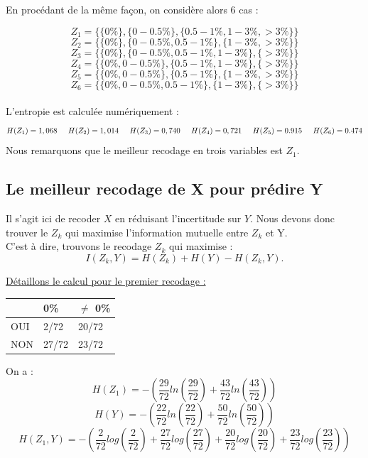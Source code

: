\documentclass{article}
\begin{document}
En procédant de la même façon, on considère alors 6 cas :

\[
Z_1 =\{ \{0 \% \} , \{0 - 0.5 \%\} ,\{0.5-1 \% ,1-3 \% ,>3 \% \} \}  
\]
\[
  Z_2 =\{ \{0 \% \} , \{0 - 0.5\%, 0.5-1 \% \} ,\{1-3 \% ,>3 \% \} \}
\]
\[
  Z_3 =\{ \{0 \% \} , \{0 - 0.5\%, 0.5-1 \% ,1-3 \%  \} ,\{>3 \% \} \}
\]
\[
  Z_4 =\{ \{0 \%, 0 - 0.5\%\} , \{ 0.5-1 \% ,1-3 \%  \} ,\{>3 \% \} \}
\]
\[
  Z_5 =\{ \{0 \%, 0 - 0.5\%\} , \{ 0.5-1 \% \} ,\{1-3 \% , >3 \% \} \}
\]
\[
  Z_6 =\{ \{0 \%, 0 - 0.5\%,  0.5-1 \% \} , \{1-3 \%  \} ,\{>3 \% \} \}
\]
\\
L'entropie est calculée numériquement :
\[
H(Z_1) = 1,068 \hspace{0.5cm} H(Z_2) = 1,014 \hspace{0.5cm} H(Z_3) = 0,740 \hspace{0.5cm} H(Z_4) = 0,721 \hspace{0,5cm} H(Z_5) = 0.915 \hspace{0,5 cm} H(Z_6) = 0.474
\]
Nous remarquons que le meilleur recodage en trois variables est $Z_1$.

\subsection{Le meilleur recodage de X pour prédire Y }

Il s'agit ici de recoder $X$ en réduisant l'incertitude sur $Y$.
Nous devons donc trouver le $Z_k$ qui maximise l'information mutuelle entre $Z_k$ et Y.
\\
C'est à dire, trouvons le recodage $Z_k$ qui maximise :
\[
I(Z_k,Y) = H(Z_k) + H(Y) - H(Z_k,Y).
\]

\underline{Détaillons le calcul pour le premier recodage :}

\begin{table}[H]
  \centering
  \begin{tabular}{|l|l|l|}
  \hline
      & 0\%   & $\neq$ 0\% \\ \hline
  OUI & 2/72  & 20/72 \\ \hline
  NON & 27/72 & 23/72 \\ \hline
  \end{tabular}
  \end{table}


  On a :
\[
H(Z_1)= -\left(\frac{29}{72}ln(\frac{29}{72})+\frac{43}{72}ln(\frac{43}{72})\right)
\]
\[
H(Y)=-\left(\frac{22}{72}ln(\frac{22}{72})+\frac{50}{72}ln(\frac{50}{72})\right)
\]
\[
H(Z_1,Y)=-\left(\frac{2}{72}log(\frac{2}{72})+\frac{27}{72}log(\frac{27}{72})+\frac{20}{72}log(\frac{20}{72})+\frac{23}{72}log(\frac{23}{72})\right)
\]
\end{document}

